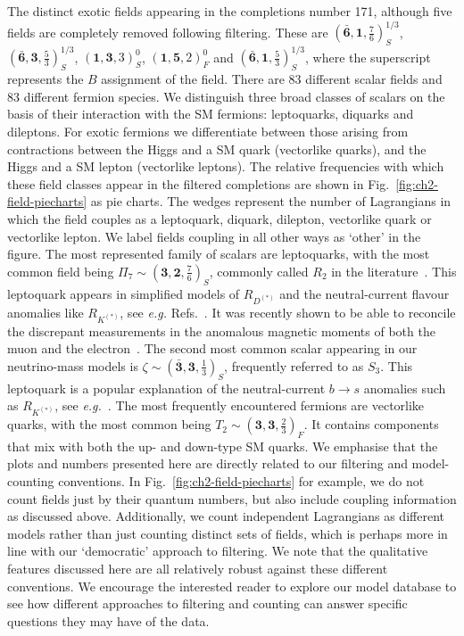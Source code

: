 The distinct exotic fields appearing in the completions number 171, although
five fields are completely removed following filtering. These are
$(\mathbf{\bar{6}}, \mathbf{1}, \tfrac{7}{6})_{S}^{1/3}$,
$(\mathbf{\bar{6}}, \mathbf{3}, \tfrac{5}{3})_{S}^{1/3}$,
$(\mathbf{1}, \mathbf{3}, 3)^{0}_{S}$, $(\mathbf{1}, \mathbf{5}, 2)^{0}_{F}$ and
$(\mathbf{\bar{6}}, \mathbf{1}, \tfrac{5}{3})^{1/3}_{S}$, where the superscript
represents the $B$ assignment of the field. There are 83 different scalar fields
and 83 different fermion species. We distinguish three broad classes of scalars
on the basis of their interaction with the SM fermions: leptoquarks, diquarks
and dileptons. For exotic fermions we differentiate between those arising from
contractions between the Higgs and a SM quark (vectorlike quarks), and the Higgs
and a SM lepton (vectorlike leptons). The relative frequencies with which these
field classes appear in the filtered completions are shown in
Fig.~\ref{fig:ch2-field-piecharts} as pie charts. The wedges represent the number of
Lagrangians in which the field couples as a leptoquark, diquark, dilepton,
vectorlike quark or vectorlike lepton. We label fields coupling in all other
ways as `other' in the figure. The most represented family of scalars are
leptoquarks, with the most common field being
$\Pi_{7} \sim (\mathbf{3}, \mathbf{2}, \tfrac{7}{6})_{S}$, commonly called
$R_{2}$ in the literature~\cite{Dorsner:2016wpm}. This leptoquark appears in
simplified models of $R_{D^{(*)}}$ and the neutral-current flavour anomalies
like $R_{K^{(*)}}$, see \textit{e.g.} Refs.~\cite{Sakaki:2013bfa,
  Angelescu:2018tyl, Becirevic:2018uab, Popov:2019tyc, Becirevic:2017jtw}. It
was recently shown to be able to reconcile the discrepant measurements in the
anomalous magnetic moments of both the muon and the
electron~\cite{Bigaran:2020jil, Dorsner:2020aaz}. The second most common scalar
appearing in our neutrino-mass models is
$\zeta \sim (\mathbf{\bar{3}}, \mathbf{3}, \tfrac{1}{3})_{S}$, frequently
referred to as $S_{3}$. This leptoquark is a popular explanation of the
neutral-current $b \to s$ anomalies such as $R_{K^{(*)}}$, see
\textit{e.g.}~\cite{Hiller:2014yaa, Gripaios:2014tna, Hiller:2017bzc,
  Dorsner:2017ufx, Angelescu:2018tyl}. The most frequently encountered fermions
are vectorlike quarks, with the most common being
$T_{2}\sim (\mathbf{3}, \mathbf{3}, \tfrac{2}{3})_{F}$. It contains components
that mix with both the up- and down-type SM quarks. We emphasise that the plots
and numbers presented here are directly related to our filtering and
model-counting conventions. In Fig.~\ref{fig:ch2-field-piecharts} for example, we do
not count fields just by their quantum numbers, but also include coupling
information as discussed above. Additionally, we count independent Lagrangians
as different models rather than just counting distinct sets of fields, which is
perhaps more in line with our `democratic' approach to filtering. We note that
the qualitative features discussed here are all relatively robust against these
different conventions. We encourage the interested reader to explore our model
database to see how different approaches to filtering and counting can answer
specific questions they may have of the data.

